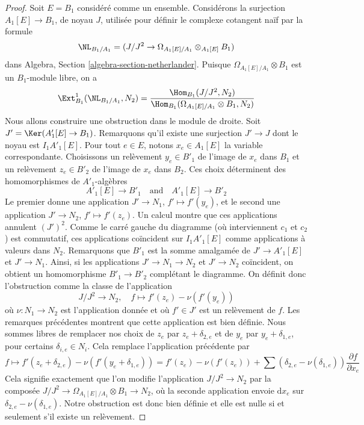 \begin{proof}
Soit $E = B_1$ considéré comme un ensemble.
Considérons la surjection $A_1[E] \to B_1$, de noyau $J$, utilisée
pour définir le complexe cotangent naïf par la formule
$$
\NL_{B_1/A_1} = (J/J^2 \to \Omega_{A_1[E]/A_1} \otimes_{A_1[E]} B_1)
$$
dans
Algebra, Section \ref{algebra-section-netherlander}.
Puisque $\Omega_{A_1[E]/A_1} \otimes B_1$ est un
$B_1$-module libre, on a
$$
\Ext^1_{B_1}(\NL_{B_1/A_1}, N_2) =
\frac{\Hom_{B_1}(J/J^2, N_2)}
{\Hom_{B_1}(\Omega_{A_1[E]/A_1} \otimes B_1, N_2)}
$$
Nous allons construire une obstruction dans le module de droite.
Soit $J' = \Ker(A'_1[E] \to B_1)$. Remarquons qu'il existe une surjection
$J' \to J$ dont le noyau est $I_1A'_1[E]$.
Pour tout $e \in E$, notons $x_e \in A_1[E]$ la variable correspondante.
Choisissons un relèvement $y_e \in B'_1$ de l'image de $x_e$ dans $B_1$ et
un relèvement $z_e \in B'_2$ de l'image de $x_e$ dans $B_2$.
Ces choix déterminent des homomorphismes de $A'_1$-algèbres
$$
A'_1[E] \to B'_1 \quad\text{and}\quad A'_1[E] \to B'_2
$$
Le premier donne une application $J' \to N_1$, $f' \mapsto f'(y_e)$,
et le second une application $J' \to N_2$, $f' \mapsto f'(z_e)$.
Un calcul montre que ces applications annulent $(J')^2$.
Comme le carré gauche du diagramme (où interviennent $c_1$ et $c_2$)
est commutatif, ces applications coïncident sur $I_1A'_1[E]$ comme applications à valeurs dans $N_2$.
Remarquons que $B'_1$ est la somme amalgamée de $J' \to A'_1[E]$ et $J' \to N_1$.
Ainsi, si les applications $J' \to N_1 \to N_2$ et $J' \to N_2$ coïncident, on
obtient un homomorphisme $B'_1 \to B'_2$ complétant le diagramme.
On définit donc l'obstruction comme la classe de l'application
$$
J/J^2 \to N_2,\quad f \mapsto f'(z_e) - \nu(f'(y_e))
$$
où $\nu : N_1 \to N_2$ est l'application donnée et où $f' \in J'$
est un relèvement de $f$. Les remarques précédentes montrent que cette application est bien définie.
Nous sommes libres
de remplacer nos choix de $z_e$ par $z_e + \delta_{2, e}$
et de $y_e$ par $y_e + \delta_{1, e}$, pour certains $\delta_{i, e} \in N_i$.
Cela remplace l'application précédente par
$$
f \mapsto f'(z_e + \delta_{2, e}) - \nu(f'(y_e + \delta_{1, e})) =
f'(z_e) - \nu(f'(z_e)) +
\sum (\delta_{2, e} - \nu(\delta_{1, e}))\frac{\partial f}{\partial x_e}
$$
Cela signifie exactement que l'on modifie l'application $J/J^2 \to N_2$
par la composée $J/J^2 \to \Omega_{A_1[E]/A_1} \otimes B_1 \to N_2$,
où la seconde application envoie $\text{d}x_e$ sur
$\delta_{2, e} - \nu(\delta_{1, e})$. Notre obstruction est donc bien définie
et elle est nulle si et seulement s'il existe un relèvement.


\end{proof}
